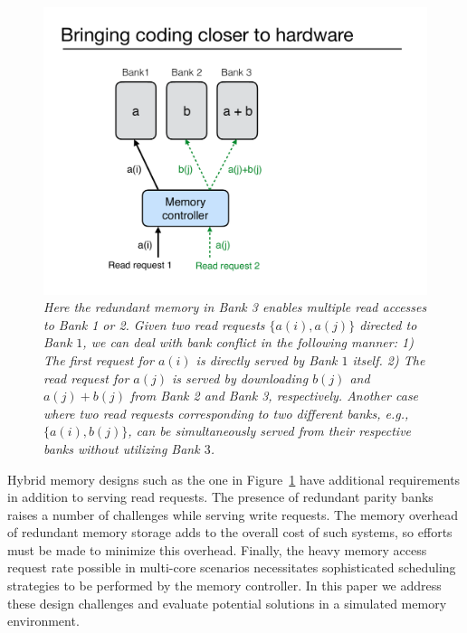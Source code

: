 \begin{figure}[t!]
\centering
\includegraphics[width=0.395\linewidth]{fig/example-xor.pdf}
\caption{\it{Here the redundant memory in Bank 3 enables multiple read accesses to Bank 1 or 2. Given two read requests $\{a(i), a(j)\}$ directed to Bank $1$, we can deal with bank conflict in the following manner: 1) The first request for $a(i)$ is directly served by Bank $1$ itself.  2) The read request for $a(j)$ is served by downloading $b(j)$ and $a(j) + b(j)$ from Bank 2 and Bank 3, respectively. Another case where two read requests corresponding to two different banks, e.g., $\{a(i), b(j)\}$, can be simultaneously served from their respective banks without utilizing Bank $3$.}}
\label{fig:example_xor}
\end{figure}
Hybrid memory designs such as the one in Figure~\ref{fig:example_xor} have additional requirements in addition to serving read requests. The presence of redundant parity banks raises a number of challenges while serving write requests. The memory overhead of redundant memory storage adds to the overall cost of such systems, so efforts must be made to minimize this overhead. Finally, the heavy memory access request rate possible in multi-core scenarios necessitates sophisticated scheduling strategies to be performed by the memory controller. In this paper we address these design challenges and evaluate potential solutions in a simulated memory environment. 

